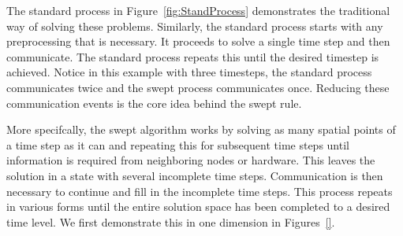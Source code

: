 \documentclass[mca,article,submit,moreauthors,pdftex]{Definitions/mdpi}
\begin{document}
\begin{paracol}{2}
\linenumbers
\switchcolumn

The standard process in Figure~\ref{fig:StandProcess} demonstrates the traditional way of solving these problems. Similarly, the standard process starts with any preprocessing that is necessary. It proceeds to solve a single time step and then communicate. The standard process repeats this until the desired timestep is achieved. Notice in this example with three timesteps, the standard process communicates twice and the swept process communicates once. Reducing these communication events is the core idea behind the swept rule.

More specifcally, the swept algorithm works by solving as many spatial points of a time step as it can and repeating this for subsequent time steps until information is required from neighboring nodes or hardware. This leaves the solution in a state with several incomplete time steps. Communication is then necessary to continue and fill in the incomplete time steps. This process repeats in various forms until the entire solution space has been completed to a desired time level. We first demonstrate this in one dimension in Figures~\ref{}.



\end{paracol}
\nointerlineskip

\begin{figure}[htbp]
    
\end{figure}
\end{document}
